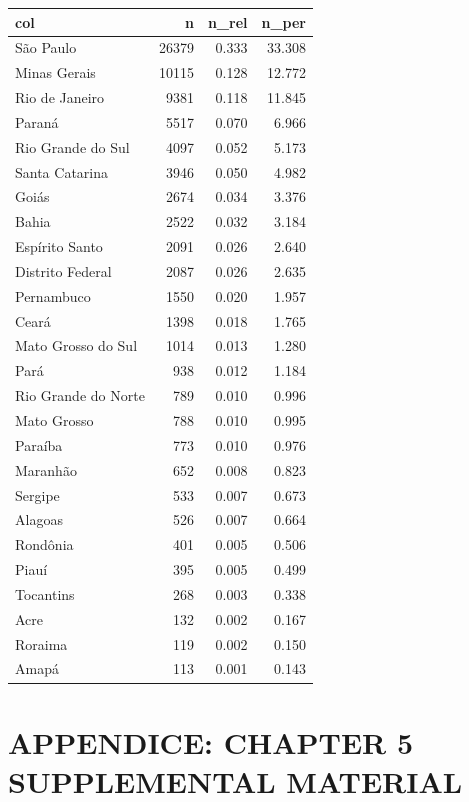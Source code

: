 \documentclass[
  12pt,
  a4paper,
  oneside]{tesesusp}
\begin{document}
\begin{table}
\centering
\begin{tabular}{l|r|r|r}
\hline
col & n & n\_rel & n\_per\\
\hline
São Paulo & 26379 & 0.333 & 33.308\\
\hline
Minas Gerais & 10115 & 0.128 & 12.772\\
\hline
Rio de Janeiro & 9381 & 0.118 & 11.845\\
\hline
Paraná & 5517 & 0.070 & 6.966\\
\hline
Rio Grande do Sul & 4097 & 0.052 & 5.173\\
\hline
Santa Catarina & 3946 & 0.050 & 4.982\\
\hline
Goiás & 2674 & 0.034 & 3.376\\
\hline
Bahia & 2522 & 0.032 & 3.184\\
\hline
Espírito Santo & 2091 & 0.026 & 2.640\\
\hline
Distrito Federal & 2087 & 0.026 & 2.635\\
\hline
Pernambuco & 1550 & 0.020 & 1.957\\
\hline
Ceará & 1398 & 0.018 & 1.765\\
\hline
Mato Grosso do Sul & 1014 & 0.013 & 1.280\\
\hline
Pará & 938 & 0.012 & 1.184\\
\hline
Rio Grande do Norte & 789 & 0.010 & 0.996\\
\hline
Mato Grosso & 788 & 0.010 & 0.995\\
\hline
Paraíba & 773 & 0.010 & 0.976\\
\hline
Maranhão & 652 & 0.008 & 0.823\\
\hline
Sergipe & 533 & 0.007 & 0.673\\
\hline
Alagoas & 526 & 0.007 & 0.664\\
\hline
Rondônia & 401 & 0.005 & 0.506\\
\hline
Piauí & 395 & 0.005 & 0.499\\
\hline
Tocantins & 268 & 0.003 & 0.338\\
\hline
Acre & 132 & 0.002 & 0.167\\
\hline
Roraima & 119 & 0.002 & 0.150\\
\hline
Amapá & 113 & 0.001 & 0.143\\
\hline
\end{tabular}
\end{table}

\hypertarget{appendice-chapter-5-supplemental-material}{%
\chapter{APPENDICE: CHAPTER 5 SUPPLEMENTAL
MATERIAL}\label{appendice-chapter-5-supplemental-material}}
\end{document}

